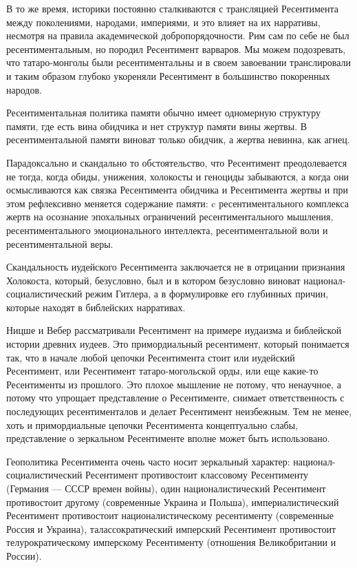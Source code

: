 В то же время, историки постоянно сталкиваются с трансляцией Ресентимента между
поколениями, народами, империями, и это влияет на их нарративы, несмотря на
правила академической добропорядочности. Рим сам по себе не был
ресентиментальным, но породил Ресентимент варваров. Мы можем подозревать, что
татаро-монголы были ресентиментальны и в своем завоевании транслировали и таким
образом глубоко укореняли Ресентимент в большинство покоренных народов.

Ресентиментальная политика памяти обычно имеет одномерную структуру памяти, где
есть вина обидчика и нет структур памяти вины жертвы. В ресентиментальной
памяти виноват только обидчик, а жертва невинна, как агнец.

Парадоксально и скандально то обстоятельство, что Ресентимент преодолевается не
тогда, когда обиды, унижения, холокосты и геноциды забываются, а когда они
осмысливаются как связка Ресентимента обидчика и Ресентимента жертвы и при этом
рефлексивно меняется содержание памяти: c ресентиментального комплекса жертв на
осознание эпохальных ограничений ресентиментального мышления,
ресентиментального эмоционального интеллекта, ресентиментальной воли и
ресентиментальной веры.

Скандальность иудейского Ресентимента заключается не в отрицании признания
Холокоста, который, безусловно, был и в котором безусловно виноват
национал-социалистический режим Гитлера, а в формулировке его глубинных причин,
которые находят в библейских нарративах.

Ницше и Вебер рассматривали Ресентимент на примере иудаизма и библейской
истории древних иудеев. Это примордиальный ресентимент, который понимается так,
что в начале любой цепочки Ресентимента стоит или иудейский Ресентимент, или
Ресентимент татаро-могольской орды, или еще какие-то Ресентименты из прошлого.
Это плохое мышление не потому, что ненаучное, а потому что упрощает
представление о Ресентименте, снимает ответственность с последующих
ресентименталов и делает Ресентимент неизбежным. Тем не менее, хоть и
примордиальные цепочки Ресентимента концептуально слабы, представление о
зеркальном Ресентименте вполне может быть использовано.

Геополитика Ресентимента очень часто носит зеркальный характер:
национал-социалистический Ресентимент противостоит классовому Ресентименту
(Германия — СССР времен войны), один националистический Ресентимент
противостоит другому (современные Украина и Польша), империалистический
Ресентимент противостоит националистическому ресентименту (современные Россия и
Украина), талассократический имперский Ресентимент противостоит
телурократическому имперскому Ресентименту (отношения Великобритании и России).

